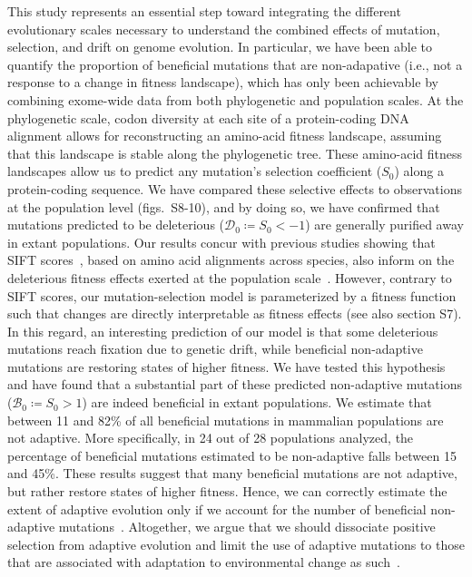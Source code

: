 \documentclass{article}
\newcommand{\Sphy}{S_{0}}
\newcommand{\SphyDel}{\mathcal{D}_0}
\newcommand{\SphyBen}{\mathcal{B}_0}
\begin{document}
    This study represents an essential step toward integrating the different evolutionary scales necessary to understand the combined effects of mutation, selection, and drift on genome evolution.
    In particular, we have been able to quantify the proportion of beneficial mutations that are non-adapative (i.e., not a response to a change in fitness landscape), which has only been achievable by combining exome-wide data from both phylogenetic and population scales.
    At the phylogenetic scale, codon diversity at each site of a protein-coding DNA alignment allows for reconstructing an amino-acid fitness landscape, assuming that this landscape is stable along the phylogenetic tree.
    These amino-acid fitness landscapes allow us to predict any mutation’s selection coefficient ($\Sphy$) along a protein-coding sequence.
    We have compared these selective effects to observations at the population level (figs.~S8-10), and by doing so, we have confirmed that mutations predicted to be deleterious ($\SphyDel \coloneqq \Sphy < -1$) are generally purified away in extant populations.
    Our results concur with previous studies showing that SIFT scores~\cite{ng_sift_2003, vaser_sift_2016}, based on amino acid alignments across species, also inform on the deleterious fitness effects exerted at the population scale~\cite{chen_hunting_2021}.
    However, contrary to SIFT scores, our mutation-selection model is parameterized by a fitness function such that changes are directly interpretable as fitness effects (see also section S7).
    In this regard, an interesting prediction of our model is that some deleterious mutations reach fixation due to genetic drift, while beneficial non-adaptive mutations are restoring states of higher fitness.
    We have tested this hypothesis and have found that a substantial part of these predicted non-adaptive mutations ($\SphyBen \coloneqq \Sphy > 1 $) are indeed beneficial in extant populations.
    We estimate that between 11 and 82\% of all beneficial mutations in mammalian populations are not adaptive.
    More specifically, in 24 out of 28 populations analyzed, the percentage of beneficial mutations estimated to be non-adaptive falls between 15 and 45\%.
    These results suggest that many beneficial mutations are not adaptive, but rather restore states of higher fitness.
    Hence, we can correctly estimate the extent of adaptive evolution only if we account for the number of beneficial non-adaptive mutations~\cite{keightley_what_2010, rice_evolutionarily_2015}.
    Altogether, we argue that we should dissociate positive selection from adaptive evolution and limit the use of adaptive mutations to those that are associated with adaptation to environmental change as such~\cite{charlesworth_other_2007, mustonen_fitness_2009}.
\end{document}
